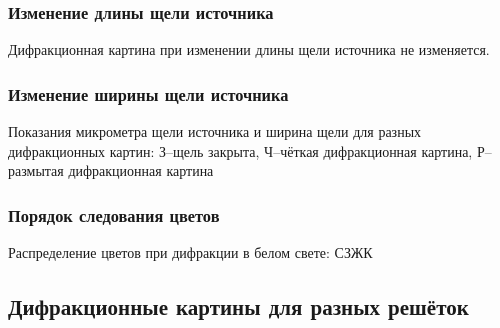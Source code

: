 \subsubsection{Изменение длины щели источника}
Дифракционная картина при изменении длины щели источника не изменяется. 

\subsubsection{Изменение ширины щели источника}

\begin{table}[H]
	    \caption{Показания микрометра щели источника и ширина щели для разных дифракционных картин: З--щель закрыта, Ч--чёткая дифракционная картина, Р--размытая дифракционная картина}
	    \label{tab:chem1}

	\mytable
	
\end{table}

\subsubsection{Порядок следования цветов}
Распределение цветов при дифракции в белом свете: СЗЖК

\newpage
\subsection{Дифракционные картины для разных решёток}
